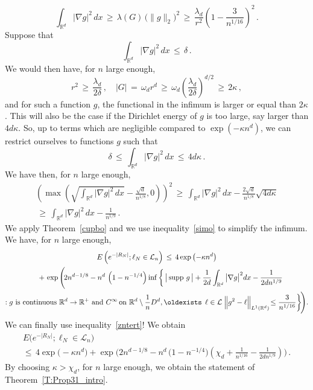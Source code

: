 \documentclass[AHL, Unicode, longabstracts, published]{cedram}
\newcommand*\supp{\text{supp\,}}
\newcommand*\Rd {{\mathbb R^d}}
\newcommand*\R{\mathbb{R}}
\newcommand{\cL}{\mathcal{L}}
\renewcommand*{\exists}{\mathrel{\oldexists}}
\begin{document}
\[
\int_{\Rd}\big|\nabla g\big|^2\,dx\,\geq\,
\lambda(G)\,\big(\|g\|_2\big)^2\,\geq\,
\frac{\lambda_d}{r^{2}}
\left(1-\frac{3}{n^{1/16}}\right)^2
\,.
\]
Suppose that
\[
\int_{\Rd}\big|\nabla g\big|^2\,dx\,\leq\,\delta\,.
\]
We would then have, for $n$ large enough,
\[
r^2\,\geq\,
\frac{\lambda_d}{{2}\delta}\,,\quad |G|\,=\,
\omega_dr^d\,\geq\,
\omega_d
\left(\frac{\lambda_d}{{2}\delta}\right)^{d/2}\,\geq\,2\kappa
\,,
\]
and for such a function $g$, the functional in the infimum is larger or equal than $2\kappa$. This will also be the case if the Dirichlet energy of $g$ is too large, say larger than $4d\kappa$. So, up to terms which are negligible compared to $\exp(-\kappa n^d)$, we can restrict ourselves to functions $g$ such that
\[
\delta\,\leq\,\int_{\Rd}\big|\nabla g\big|^2\,dx\,\leq\,4d\kappa\,.
\]
We have then, for $n$ large enough,
\begin{multline}\label{simo}
\left(\max\left(
\sqrt{
\int_{\Rd}\big|\nabla g\big|^2\,dx }-
\frac{\sqrt{d}}{n^{1/8}},0\right) \right)^2
\,\geq\,
\int_{\Rd}\big|\nabla g\big|^2\,dx-
\frac{2\sqrt{d}}{n^{1/8}}\sqrt{4d\kappa}\\
\,\geq\,
\int_{\Rd}\big|\nabla g\big|^2\,dx-
\frac{1}{n^{1/9}}
\,.
\end{multline}
We apply Theorem~\ref{cupbo} and we use inequality~\eqref{simo} to simplify the infimum. We have, for $n$ large enough,
\begin{multline*}
E\left(e^{-|R_N|};
\ell_N\in\cL_n\right)\,\leq\, 4\exp\left(-\kappa n^d\right)
\\
\mkern20mu+\,\exp\Bigg(\!2n^{d-1/8}- n^d\, \left(1-n^{-1/4}\right)
\inf\bigg\{\,
\big|\,\supp\,g\,\big| +
\frac{1} {2d}
\int_{\Rd}\big|\nabla g\big|^2 dx-
\frac{1}{2dn^{1/9}}
\\
: g\text{ is continuous } \Rd\to\R^+
\text{ and }C^\infty\!\text{ on }\Rd\setminus \frac{1}{n}D^d,
\exists\,\ell\in\cL\;
\Big\|g^2- \ell\Big\|_{L^1(\Rd)}
\!\leq
\frac{3}{n^{1/16}}\!
\,\bigg\}\!\Bigg).
\end{multline*}
We can finally use inequality~\eqref{zntert}! We obtain
\begin{multline*}
E\big(e^{-|R_N|};
\ell_N\in\cL_n\big)\\
\leq\, 4\exp\big(-\kappa n^d\big)+
\exp\Bigg(2n^{d-1/8}- n^d\, \big(1-n^{-1/4}\big)
\left(
\chi_d+ \frac{1}{n^{1/16}} -\frac{1}{2dn^{1/9}}
\right)\Bigg)\,.
\end{multline*}
By choosing $\kappa> \chi_d$, for $n$ large enough, we obtain the statement of Theorem~\ref{T:Prop31_intro}.
\end{document}
